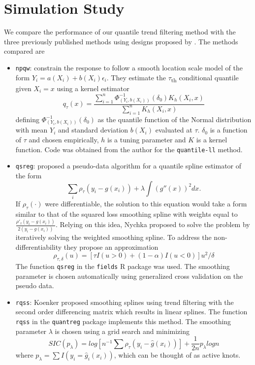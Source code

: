 \documentclass[]{article}
\begin{document}
\section{Simulation Study}

We compare the performance of our quantile trend filtering method with the three previously published methods using designs proposed by \cite{Racine2017}. The methods compared are 

\begin{itemize}
	\item \texttt{npqw}: \cite{Racine2017} constrain the response to follow a smooth location scale model of the form $Y_i = a(X_i) + b(X_i)\epsilon_i$. They estimate the $\tau$\textsubscript{th} conditional quantile given $X_i = x$ using a kernel estimator
	\begin{equation}
		q_{\tau}(x) = \frac{\sum_{i=1}^n \Phi^{-1}_{(Y_i, b(X_i))}(\delta_0)K_h(X_i,x)}{\sum_{i=1}^nK_h(X_i, x)}
	\end{equation}
	defining $\Phi^{-1}_{(Y_i, b(X_i))}(\delta_0)$ as the quantile function of the Normal distribution with mean $Y_i$ and standard deviation $b(X_i)$ evaluated at $\tau$. $\delta_0$ is a function of $\tau$ and chosen empirically, $h$ is a tuning parameter and $K$ is a kernel function. Code was obtained from the author for the \texttt{quantile-ll} method. 
	
	\item \texttt{qsreg}: \cite{Oh2011} proposed a pseudo-data algorithm for a quantile spline estimator of the form 
	\begin{equation}
	\sum_i \rho_{\tau}(y_i - g(x_i)) + \lambda\int(g''(x))^2dx.
	\end{equation} 
	If $\rho_{\tau}(\cdot)$ were differentiable, the solution to this equation would take a form similar to that of the squared loss smoothing spline with weights equal to $\frac{\rho'_{\tau}(y_i-g(x_i))}{2(y_i - g(x_i))}$. Relying on this idea, Nychka proposed to solve the problem by iteratively solving the weighted smoothing spline. To address the non-differentiability they propose an approximation 
	\begin{equation}
	\rho_{\tau, \delta}(u) = [\tau I(u>0) + (1-\alpha)I(u<0)]u^2/\delta
	\end{equation}
	The function \texttt{qsreg} in the \texttt{fields} R package was used. The smoothing parameter is chosen automatically using generalized cross validation on the pseudo data.
	
	\item \texttt{rqss}: \cite{KoenkerNgPortnoy1994} Koenker proposed smoothing splines using trend filtering with the second order differencing matrix which results in linear splines. The function \texttt{rqss} in the \texttt{quantreg} package implements this method. The smoothing parameter $\lambda$ is chosen using a grid search and minimizing 
	\begin{equation}
	SIC(p_{\lambda}) = log[n^{-1}\sum\rho_{\tau}(y_i - \widehat{g}(x_i))] + \frac{1}{2n}p_{\lambda}log n
	\end{equation}
	where $p_{\lambda} = \sum I(y_i = \widehat{g}_i(x_i))$, which can be thought of as active knots.
	

\end{itemize}
\end{document}

